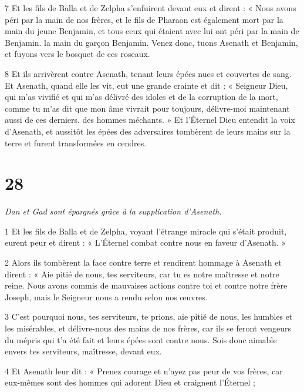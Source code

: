 \par 7 Et les fils de Balla et de Zelpha s'enfuirent devant eux et dirent : « Nous avons péri par la main de nos frères, et le fils de Pharaon est également mort par la main du jeune Benjamin, et tous ceux qui étaient avec lui ont péri par la main de Benjamin. la main du garçon Benjamin. Venez donc, tuons Asenath et Benjamin, et fuyons vers le bosquet de ces roseaux.

\par 8 Et ils arrivèrent contre Asenath, tenant leurs épées nues et couvertes de sang. Et Asenath, quand elle les vit, eut une grande crainte et dit : « Seigneur Dieu, qui m'as vivifié et qui m'as délivré des idoles et de la corruption de la mort, comme tu m'as dit que mon âme vivrait pour toujours, délivre-moi maintenant aussi de ces derniers. des hommes méchants. » Et l'Éternel Dieu entendit la voix d'Asenath, et aussitôt les épées des adversaires tombèrent de leurs mains sur la terre et furent transformées en cendres.

\chapter{28}

\par \textit{Dan et Gad sont épargnés grâce à la supplication d'Asenath.}


\par 1 Et les fils de Balla et de Zelpha, voyant l'étrange miracle qui s'était produit, eurent peur et dirent : « L'Éternel combat contre nous en faveur d'Asenath. »

\par 2 Alors ils tombèrent la face contre terre et rendirent hommage à Asenath et dirent : « Aie pitié de nous, tes serviteurs, car tu es notre maîtresse et notre reine. Nous avons commis de mauvaises actions contre toi et contre notre frère Joseph, mais le Seigneur nous a rendu selon nos œuvres.

\par 3 C'est pourquoi nous, tes serviteurs, te prions, aie pitié de nous, les humbles et les misérables, et délivre-nous des mains de nos frères, car ils se feront vengeurs du mépris qui t'a été fait et leurs épées sont contre nous. Sois donc aimable envers tes serviteurs, maîtresse, devant eux.

\par 4 Et Asenath leur dit : « Prenez courage et n'ayez pas peur de vos frères, car eux-mêmes sont des hommes qui adorent Dieu et craignent l'Éternel ;

